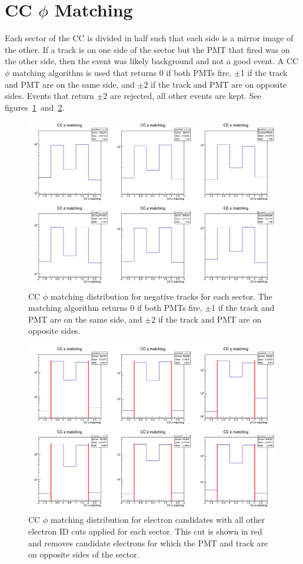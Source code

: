 \section{CC $\phi$ Matching}
\label{sec:CCphiMatching}
%
Each sector of the CC is divided in half such that each side is a mirror image of the other.
If a track is on one side of the sector but the PMT that fired was on the other side, then the event was likely background and not a good event.
A CC $\phi$ matching algorithm is used that returns 0 if both PMTs fire, $\pm$1 if the track and PMT are on the same side, and $\pm$2 if the track and PMT are on opposite sides.
Events that return $\pm$2 are rejected, all other events are kept.
See figures~\ref{fig:CCphiMatch_c0}~and~\ref{fig:CCphiMatch_c1}.
%
\begin{figure}[htp]
\centering
\includegraphics[width=5in]{figures/CCphiMatch_c0.png}
\caption{CC $\phi$ matching distribution for negative tracks for each sector. The matching algorithm returns 0 if both PMTs fire, $\pm$1 if the track and PMT are on the same side, and $\pm$2 if the track and PMT are on opposite sides.}
\label{fig:CCphiMatch_c0}
\end{figure}
%
\begin{figure}[htp]
\centering
\includegraphics[width=5in]{figures/CCphiMatch_c1.png}
\caption{CC $\phi$ matching distribution for electron candidates with all other electron ID cuts applied for each sector. This cut is shown in red and removes candidate electrons for which the PMT and track are on opposite sides of the sector.}
\label{fig:CCphiMatch_c1}
\end{figure}
%
%
